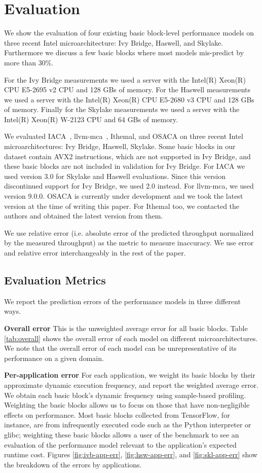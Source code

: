 \section{Evaluation}
We show the evaluation of four existing basic block-level
performance models on three recent Intel microarchitecture:
Ivy Bridge, Haswell, and Skylake. Furthermore we discuss a few basic blocks where most models
mis-predict by more than 30\%.

For the Ivy Bridge measurements we used a server with the Intel(R) Xeon(R) CPU E5-2695 v2 CPU and 128 GBs of memory. 
For the Haswell measurements we used a server with the Intel(R) Xeon(R) CPU E5-2680 v3 CPU and 128 GBs of memory. 
Finally for the Skylake measurements we used a server with the Intel(R) Xeon(R) W-2123 CPU and 64 GBs of memory. 

We evaluated IACA~\cite{iaca}, llvm-mca~\cite{llvm-mca}, Ithemal\cite{ithemal}, and OSACA\cite{osaca}
on three recent Intel microarchitectures: Ivy Bridge, Haswell, Skylake.
Some basic blocks in our dataset contain AVX2 instructions, which are not supported in Ivy Bridge,
and these basic blocks are not included in validation for Ivy Bridge.
For IACA we used version 3.0 for Skylake and Haswell evaluations. Since this version discontinued support for Ivy Bridge, we used 2.0 instead.
For llvm-mca, we used version 9.0.0. OSACA is currently under development and we took the latest version at the time of writing this paper. For Ithemal too, we contacted the authors and obtained the latest version from them. 

We use relative error (i.e. absolute error of the predicted throughput normalized by the measured throughput)
as the metric to measure inaccuracy.
We use error and relative error interchangeably in the rest of the paper.

\subsection{Evaluation Metrics}\label{results}
We report the prediction errors of the performance models in three different ways.

\textbf{Overall error} This is the unweighted average error for all basic blocks.
Table \ref{tab:overall} shows the overall error of each model on different microarchitectures.
We note that the overall error of each model can be unrepresentative
of its performance on a given domain.

\textbf{Per-application error}
For each application, we weight its basic blocks by their approximate
dynamic execution frequency,
and report the weighted average error.
We obtain each basic block's dynamic frequency using sample-based profiling.
Weighting the basic blocks allows us to focus on those that have
non-negligible effects on performance.
Most basic blocks collected from TensorFlow\cite{tensorflow},
for instance, are from infrequently executed code 
such as the Python interpreter or glibc;
weighting these basic blocks allows a user of the benchmark
to see an evaluation  of the performance model relevant
to the application's expected runtime cost.
Figures \ref{fig:ivb-app-err}, \ref{fig:hsw-app-err}, and \ref{fig:skl-app-err}
show the breakdown of the errors by applications.

